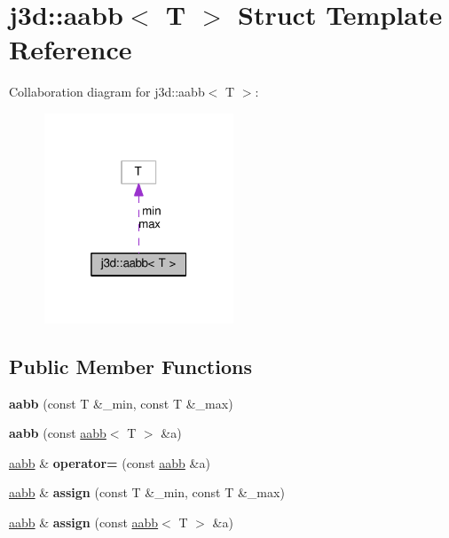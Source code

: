 \hypertarget{structj3d_1_1aabb}{}\section{j3d\+:\+:aabb$<$ T $>$ Struct Template Reference}
\label{structj3d_1_1aabb}


Collaboration diagram for j3d\+:\+:aabb$<$ T $>$\+:
\nopagebreak
\begin{figure}[H]
\begin{center}
\leavevmode
\includegraphics[width=160pt]{structj3d_1_1aabb__coll__graph}
\end{center}
\end{figure}
\subsection*{Public Member Functions}
\begin{DoxyCompactItemize}
\item 
\hypertarget{structj3d_1_1aabb_a7b6f5904f2c3a70e249aa863283e06f1}{}{\bfseries aabb} (const T \&\+\_\+min, const T \&\+\_\+max)\label{structj3d_1_1aabb_a7b6f5904f2c3a70e249aa863283e06f1}

\item 
\hypertarget{structj3d_1_1aabb_aa33a0a9b589417b802f02686b747a051}{}{\bfseries aabb} (const \hyperlink{structj3d_1_1aabb}{aabb}$<$ T $>$ \&a)\label{structj3d_1_1aabb_aa33a0a9b589417b802f02686b747a051}

\item 
\hypertarget{structj3d_1_1aabb_afd7c32cadccc09d11d99287a6d9962e3}{}\hyperlink{structj3d_1_1aabb}{aabb} \& {\bfseries operator=} (const \hyperlink{structj3d_1_1aabb}{aabb} \&a)\label{structj3d_1_1aabb_afd7c32cadccc09d11d99287a6d9962e3}

\item 
\hypertarget{structj3d_1_1aabb_a96053e9d9f442346c0a0af5f60501d7a}{}\hyperlink{structj3d_1_1aabb}{aabb} \& {\bfseries assign} (const T \&\+\_\+min, const T \&\+\_\+max)\label{structj3d_1_1aabb_a96053e9d9f442346c0a0af5f60501d7a}

\item 
\hypertarget{structj3d_1_1aabb_aaf4e2d4865cb1c822925d7c8a13dccb5}{}\hyperlink{structj3d_1_1aabb}{aabb} \& {\bfseries assign} (const \hyperlink{structj3d_1_1aabb}{aabb}$<$ T $>$ \&a)\label{structj3d_1_1aabb_aaf4e2d4865cb1c822925d7c8a13dccb5}

\end{DoxyCompactItemize}
